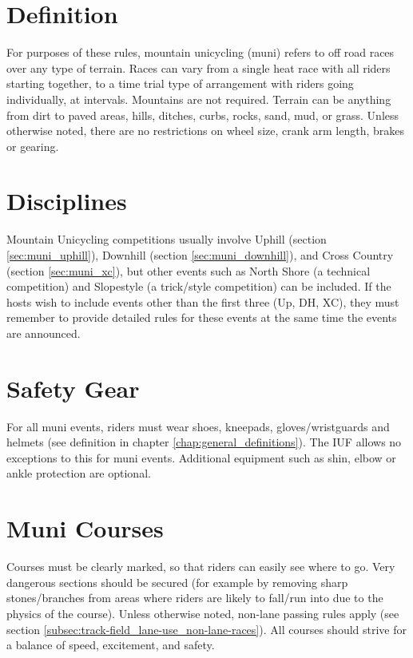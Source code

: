 
\section{Definition}
For purposes of these rules, mountain unicycling (muni) refers to off road races over any type of terrain.
Races can vary from a single heat race with all riders starting together, to a time trial type of arrangement with riders going individually, at intervals.
Mountains are not required.
Terrain can be anything from dirt to paved areas, hills, ditches, curbs, rocks, sand, mud, or grass.
Unless otherwise noted, there are no restrictions on wheel size, crank arm length, brakes or gearing.

\section{Disciplines}
Mountain Unicycling competitions usually involve Uphill (section \ref{sec:muni_uphill}), Downhill (section \ref{sec:muni_downhill}), and Cross Country (section \ref{sec:muni_xc}), but other events such as North Shore (a technical competition) and Slopestyle (a trick/style competition) can be included.
If the hosts wish to include events other than the first three (Up, DH, XC), they must remember to provide detailed rules for these events at the same time the events are announced.

\section{Safety Gear}
For all muni events, riders must wear shoes, kneepads, gloves/wristguards and helmets (see definition in chapter \ref{chap:general_definitions}).
The IUF allows no exceptions to this for muni events.
Additional equipment such as shin, elbow or ankle protection are optional.

\section{Muni Courses}
Courses must be clearly marked, so that riders can easily see where to go.
Very dangerous sections should be secured (for example by removing sharp stones/branches from areas where riders are likely to fall/run into due to the physics of the course).
Unless otherwise noted, non-lane passing rules apply (see section \ref{subsec:track-field_lane-use_non-lane-races}).
All courses should strive for a balance of speed, excitement, and safety.

